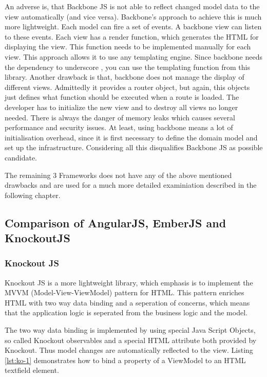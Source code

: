 An adverse is, that Backbone JS is not able to reflect changed model data to the view automatically (and vice versa).
Backbone's approach to achieve this is much more lightweight.
Each model can fire a set of events.
A backbone view can listen to these events.
Each view has a render function, which generates the HTML for displaying the view.
This function needs to be implemented manually for each view.
This approach allows it to use any templating engine.
Since backbone needs the dependency to underscore , you can use the templating function from this library.
Another drawback is that, backbone does not manage the display of different views.
Admittedly it provides a router object, but again, this objects just defines what function should be executed when a route is loaded.
The developer has to initialize the new view and to destroy all views no longer needed.
There is always the danger of memory leaks which causes several performance and security issues.
At least, using backbone  means a lot of initialisation overhead, since it is first necessary to define the domain model and set up the infrastructure.
Considering all this disqualifies Backbone JS as possible candidate.
      
The remaining 3 Frameworks does not have any of the above mentioned drawbacks and are used for a much more detailed examiniation described in the following chapter.

\subsection{Comparison of AngularJS, EmberJS and KnockoutJS}\label{chap:detail_comparison}


\subsubsection{Knockout JS}

Knockout JS is a more lightweight library, which emphasis is to implement the MVVM (Model-View-ViewModel) pattern for HTML.
This pattern enriches HTML with two way data binding and a seperation of concerns, which means that the application logic is seperated from the business logic and the model.

The two way data binding is implemented by using special Java Script Objects, so called Knockout observables and a special HTML attribute both provided by Knockout.
Thus model changes are automatically reflected to the view.
Listing \ref{lst:ko-1} demonstrates how to bind a property of a ViewModel to an HTML textfield element.

